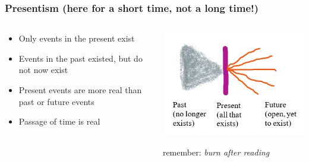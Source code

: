 \begin{frame}
\frametitle{Presentism (here for a short time, not a long time!)}


\begin{columns}
    \begin{column}{.6\textwidth}
\begin{itemize}[<+->]

\item Only events in the present exist
\item Events in the past existed, but do not now exist
\item Present events are more real than past or future events
\item Passage of time is real
\end{itemize}
  \end{column}
 
    \begin{column}{.4\textwidth}  
 \includegraphics[height=.6\textheight]{../assets/presentism}
 
   \pause remember: \textit{burn after reading}

    \end{column}
  \end{columns}
  

\end{frame}

